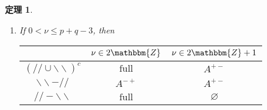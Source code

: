 \documentclass[12pt]{msjproc} %
\newcommand{\tmop}[1]{\ensuremath{\operatorname{#1}}}
\newtheorem{theorem}{定理}
\begin{document}
\begin{versiona}
\begin{theorem}
\begin{enumerate}
\begin{enumerate}
      \begin{center}
        \begin{center}
          \begin{center}
            \begin{center}
              \begin{tabular}{|c|c|c|}
                \hline
                & $\nu \in 2\mathbbm{Z}$ & $\nu \in 2\mathbbm{Z}+ 1$\\
                \hline
                $(/ / \cup \backslash\backslash)^c$ & $A^{\noplus + +}$ &
                $A^{+ -}$\\
                \hline
                $\backslash\backslash - / /$ & $A^{\noplus + +}$ & $A^{+ -}$\\
                \hline
                $/ / -\backslash\backslash$ & $\varnothing$ & $\varnothing$\\
                \hline
              \end{tabular}
            \end{center}
          \end{center}
        \end{center}
      \end{center}
      
      \item If $0 < \nu \leqslant p + q - 3$, then
      
      \begin{center}
        \begin{center}
          \begin{center}
            \begin{center}
              \begin{tabular}{|c|c|c|}
                \hline
                & $\nu \in 2\mathbbm{Z}$ & $\nu \in 2\mathbbm{Z}+ 1$\\
                \hline
                $(/ / \cup \backslash\backslash)^c$ & $\tmop{full}$ & $A^{+
                -}$\\
                \hline
                $\backslash\backslash - / /$ & $A^{- +}$ & $A^{+ -}$\\
                \hline
                $/ / -\backslash\backslash$ & $\tmop{full}$ & $\varnothing$\\
                \hline
              \end{tabular}
            \end{center}
          \end{center}
        \end{center}
      \end{center}
      

\end{enumerate}
\end{enumerate}
\end{theorem}
\end{versiona}
\end{document}
